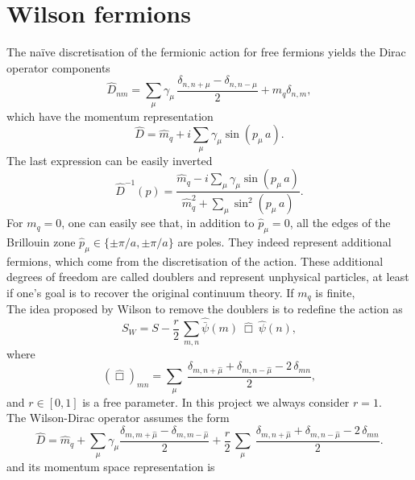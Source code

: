 \chapter{Wilson fermions}
\label{chap:AppendixB}
The na\"ive discretisation of the fermionic action for free fermions yields the Dirac operator components
\begin{equation*}
    \widehat{D}_{nm} = \sum_\mu \gamma_\mu \, \frac{\delta_{n,n+\mu} - \delta_{n,n-\mu}}{2} + m_q \delta_{n,m},
\end{equation*}
which have the momentum representation
\begin{equation*}
    \widehat D = \hat m_q + i \sum_\mu \gamma_\mu \sin \left(p_\mu \, a\right).
\end{equation*}
The last expression can be easily inverted
\begin{equation*}
    \widehat{D}^{-1}(p) = \frac{\hat m_q - i \sum_\mu \gamma_\mu \sin \left(p_\mu \, a\right)}{\hat m_q^2 + \sum_\mu \sin^2 \left(p_\mu \, a \right)}.
\end{equation*}
For $m_q = 0$, one can easily see that, in addition to $\hat{p}_\mu = 0$, all the edges of the Brillouin zone $\hat p_\mu \in \{\pm \pi/a, \pm \pi/a\}$ are poles.
They indeed represent additional fermions, which come from the discretisation of the action. These additional degrees of freedom are called doublers and represent unphysical particles, at least if one's goal is to recover the original continuum theory. 
If $m_q$ is finite,\\
The idea proposed by Wilson to remove the doublers is to redefine the action as
\begin{equation*}
    S_{W} = S - \frac{r}{2} \, \sum_{m,n} \hat{\bar\psi}(m) \ \hat\Box \ \hat{\psi}(n),
\end{equation*}
where 
\begin{equation*}
    \left(\hat\Box\right)_{mn} = \sum_\mu \ \frac{\delta_{m, n+\hat\mu} + \delta_{m, n-\hat\mu} - 2 \, \delta_{mn}}{2},
\end{equation*}
and $r \in [0,1]$ is a free parameter. In this project we always consider $r=1$.\\
The Wilson-Dirac operator assumes the form
\begin{equation*}
    \widehat D = \hat m_q + \sum_\mu \gamma_\mu \frac{\delta_{m,m+\hat\mu} - \delta_{m,m-\hat\mu}}{2} + \frac{r}{2} \, \sum_\mu \ \frac{\delta_{m, n+\hat\mu} + \delta_{m, n-\hat\mu} - 2 \, \delta_{mn}}{2}.
\end{equation*}
and its momentum space representation is
